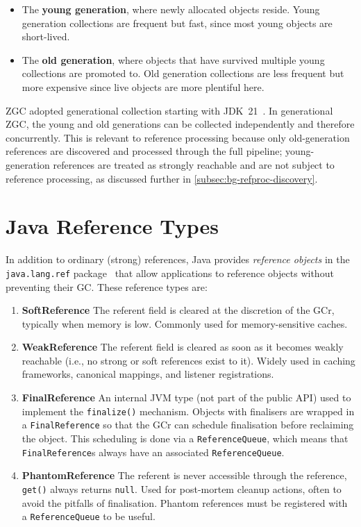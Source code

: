 \begin{itemize}
    \item The \textbf{young generation}, where newly allocated objects reside. Young generation collections are frequent but fast, since most young objects are short-lived.
    \item The \textbf{old generation}, where objects that have survived multiple young collections are promoted to. Old generation collections are less frequent but more expensive since live objects are more plentiful here.
\end{itemize}

\ac{ZGC} adopted generational collection starting with \ac{JDK}~21~\cite{jep439-genzgc}. In generational \ac{ZGC}, the young and old generations can be collected independently and therefore concurrently. This is relevant to reference processing because only old-generation references are discovered and processed through the full pipeline; young-generation references are treated as strongly reachable and are not subject to reference processing, as discussed further in \cref{subsec:bg-refproc-discovery}.


\section{Java Reference Types}
\label{sec:bg-reftypes}

In addition to ordinary (strong) references, Java provides \emph{reference objects} in the \texttt{java.lang.ref} package~\cite{oracle-ref-javadoc,openjdk-reference-java} that allow applications to reference objects without preventing their \ac{GC}. These reference types are:

\begin{enumerate}
    \item \textbf{SoftReference}   The referent field is cleared at the discretion of the \ac{GCr}, typically when memory is low. Commonly used for memory-sensitive caches.
    \item \textbf{WeakReference}   The referent field is cleared as soon as it becomes weakly reachable (i.e., no strong or soft references exist to it). Widely used in caching frameworks, canonical mappings, and listener registrations.
    \item \textbf{FinalReference}   An internal \ac{JVM} type (not part of the public \ac{API}) used to implement the \texttt{finalize()} mechanism. Objects with finalisers are wrapped in a \texttt{FinalReference} so that the \ac{GCr} can schedule finalisation before reclaiming the object. This scheduling is done via a \texttt{ReferenceQueue}, which means that \texttt{FinalReference}s always have an associated \texttt{ReferenceQueue}.
    \item \textbf{PhantomReference}   The referent is never accessible through the reference, \texttt{get()} always returns \texttt{null}. Used for post-mortem cleanup actions, often to avoid the pitfalls of finalisation. Phantom references must be registered with a \texttt{ReferenceQueue} to be useful.
\end{enumerate}

